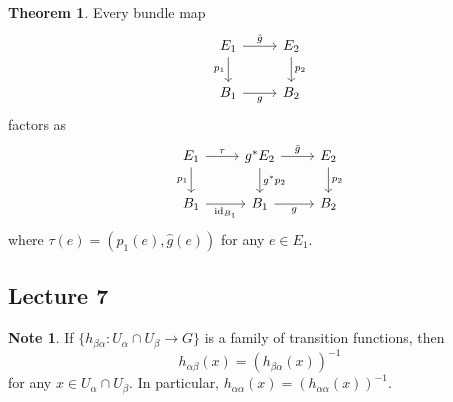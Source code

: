 \documentclass[10pt,letterpaper,cm]{nupset}
\theoremstyle{definition}
\newtheorem{note}[defn]{Note}
\theoremstyle{theorem}
\newtheorem{theorem}[defn]{Theorem}
\theoremstyle{remark}
\newcommand{\1}{\mathbb{1}}
\newcommand{\0}{\vec 0}
\DeclareMathOperator{\id}{id}
\begin{document}
\begin{theorem}\label{factors}
Every bundle map
\[
\begin{tikzcd}
E_1 \arrow[d, "p_1"'] \arrow[r, "\hat{g}"] & E_2 \arrow[d, "p_2"] \\
B_1 \arrow[r, "g"']                        & B_2                 
\end{tikzcd}
\]
factors as
\[
\begin{tikzcd}
E_1 \arrow[r, "\tau"] \arrow[d, "p_1"'] & g^{\ast}{E_2} \arrow[r, "\bar{g}"] \arrow[d, "g^{\ast}{p_2}"] & E_2 \arrow[d, "p_2"] \\
B_1 \arrow[r, "\id_{B_1}"']            & B_1 \arrow[r, "g"']                                           & B_2                 
\end{tikzcd}
\]
where $\tau(e) = \left(p_1(e), \hat{g}(e)\right)$ for any $e\in E_1$.
\end{theorem}

\subsection{Lecture 7}

\begin{note}\label{trnote}
If $\{h_{\beta{\alpha}}:U_{\alpha}\cap U_{\beta}\to G\}$ is a family of transition functions, then
\[
h_{\alpha{\beta}}(x) = \left(h_{\beta{\alpha}}(x)\right)^{-1}
\] for any $x\in U_{\alpha}\cap U_{\beta}$. In particular, $h_{\alpha{\alpha}}(x) = \left(h_{\alpha{\alpha}}(x)\right)^{-1}$.
\end{note}
\end{document}
